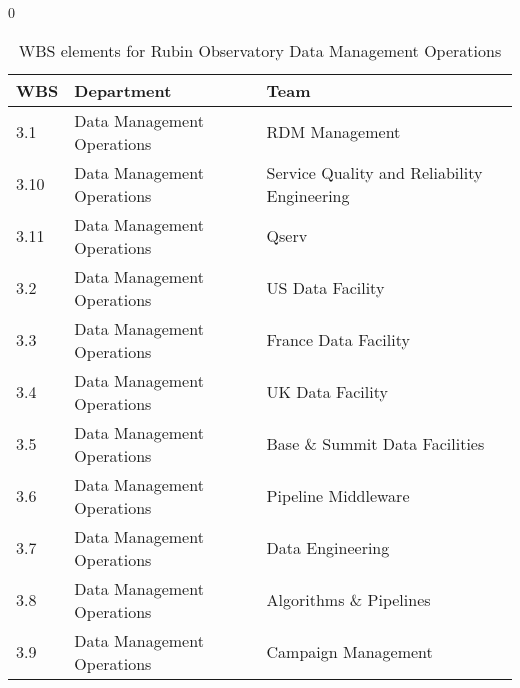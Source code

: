 0 \begin{longtable} {|p{}|l|l|} \caption{WBS elements for Rubin Observatory Data Management Operations \label{tab:dmwbs}}\\ 
\hline 
\textbf{WBS}&\textbf{Department}&\textbf{Team} \\ \hline
{3.1}&{Data Management Operations}&{RDM Management} \\ \hline
{3.10}&{Data Management Operations}&{Service Quality and Reliability Engineering} \\ \hline
{3.11}&{Data Management Operations}&{Qserv} \\ \hline
{3.2}&{Data Management Operations}&{US Data Facility} \\ \hline
{3.3}&{Data Management Operations}&{France Data Facility} \\ \hline
{3.4}&{Data Management Operations}&{UK Data Facility} \\ \hline
{3.5}&{Data Management Operations}&{Base \& Summit Data Facilities} \\ \hline
{3.6}&{Data Management Operations}&{Pipeline Middleware} \\ \hline
{3.7}&{Data Management Operations}&{Data Engineering} \\ \hline
{3.8}&{Data Management Operations}&{Algorithms \& Pipelines} \\ \hline
{3.9}&{Data Management Operations}&{Campaign Management} \\ \hline
\end{longtable} \normalsize
